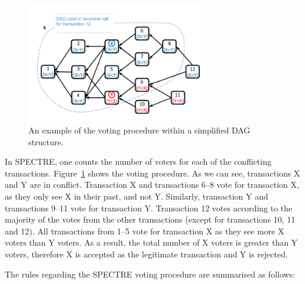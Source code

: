 \documentclass[a4paper,10pt,twocolumn]{article}
\begin{document}
\begin{figure}[ht]
	\begin{center}
	\includegraphics[width=80mm]{spectre.png}
	  \caption{An example of the voting procedure within a simplified DAG structure.}
    \label{fig:spectre}
	\end{center}
 \end{figure}

 In SPECTRE, one counts the number of voters for each of the conflicting transactions. Figure~\ref{fig:spectre} shows the voting 
 procedure. As we can see, transactions X and Y are in conflict. Transaction X and transactions 6--8 vote for transaction X, as they 
 only see X in their past, and not Y. Similarly, transaction Y and transactions 9--11 vote for transaction Y. Transaction 12 votes 
 according to the majority of the votes from the other transactions (except for transactions 10, 11 and 12). All transactions from 1--5 
 vote for transaction X as they see more X voters than Y voters. As a result, the total number of X voters is greater than Y voters, 
 therefore X is accepted as the legitimate transaction and Y is rejected. 

 The rules regarding the SPECTRE voting procedure are summarised as follows:
\end{document}
